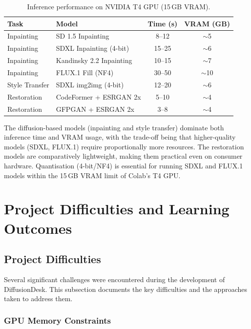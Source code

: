 \documentclass[12pt,a4paper]{report}
\begin{document}
\begin{table}[htbp]
\centering
\caption{Inference performance on NVIDIA T4 GPU (15\,GB VRAM).}
\label{tab:performance}
\begin{tabular}{llcc}
\hline
\textbf{Task} & \textbf{Model} & \textbf{Time (s)} & \textbf{VRAM (GB)} \\
\hline
Inpainting & SD 1.5 Inpainting & 8--12 & $\sim$5 \\
Inpainting & SDXL Inpainting (4-bit) & 15--25 & $\sim$6 \\
Inpainting & Kandinsky 2.2 Inpainting & 10--15 & $\sim$7 \\
Inpainting & FLUX.1 Fill (NF4) & 30--50 & $\sim$10 \\
Style Transfer & SDXL img2img (4-bit) & 12--20 & $\sim$6 \\
Restoration & CodeFormer + ESRGAN 2x & 5--10 & $\sim$4 \\
Restoration & GFPGAN + ESRGAN 2x & 3--8 & $\sim$4 \\
\hline
\end{tabular}
\end{table}

The diffusion-based models (inpainting and style transfer) dominate both inference time and VRAM usage, with the trade-off being that higher-quality models (SDXL, FLUX.1) require proportionally more resources. The restoration models are comparatively lightweight, making them practical even on consumer hardware. Quantisation (4-bit/NF4) is essential for running SDXL and FLUX.1 models within the 15\,GB VRAM limit of Colab's T4 GPU.

\newpage

\section{Project Difficulties and Learning Outcomes}

\subsection{Project Difficulties}

Several significant challenges were encountered during the development of DiffusionDesk. This subsection documents the key difficulties and the approaches taken to address them.

\subsubsection{GPU Memory Constraints}
\end{document}
